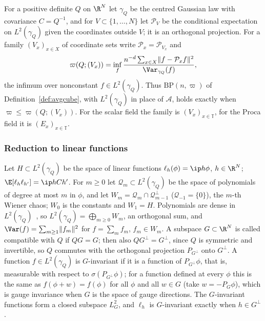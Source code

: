 For a positive definite $Q$ on $\R^N$ let $\gamma_Q$ be the centred Gaussian
law with covariance $C=Q^{-1}$, and for $V\subset\{1,\dots,N\}$ let
$\mathcal P_V$ be the conditional expectation on $L^2(\gamma_Q)$ given the
coordinates outside $V$; it is an orthogonal projection. For a family
$(V_x)_{x\in X}$ of coordinate sets write $\mathcal P_x=\mathcal P_{V_x}$
and
\begin{equation}\label{eq:ffvarpi}
\varpi(Q;(V_x))=\inf_f\frac{n^{-d}\sum_{x\in X}\lVert f-\mathcal P_xf
\rVert^2}{\Var_{\gamma_Q}(f)},
\end{equation}
the infimum over nonconstant $f\in L^2(\gamma_Q)$. Thus $\mathrm{BP}(n,
\varpi)$ of Definition~\ref{def:avgcube}, with $L^2(\gamma_Q)$ in place of
$\mathcal A$, holds exactly when $\varpi\le\varpi(Q;(V_x))$. For the scalar
field the family is $(V_x)_{x\in\mathbb T}$, for the Proca field it is
$(E_x)_{x\in\mathbb T}$.

\subsubsection{Reduction to linear functions}

Let $H\subset L^2(\gamma_Q)$ be the space of linear functions $\ell_h(\phi)
=\ip h\phi$, $h\in\R^N$; $\E[\ell_h\ell_{h'}]=\ip h{Ch'}$. For $m\ge0$ let
$\mathcal Q_m\subset L^2(\gamma_Q)$ be the space of polynomials of degree at
most $m$ in $\phi$, and let $W_m=\mathcal Q_m\cap\mathcal Q_{m-1}^\perp$
($\mathcal Q_{-1}=\{0\}$), the $m$-th Wiener chaos; $W_0$ is the constants
and $W_1=H$. Polynomials are dense in $L^2(\gamma_Q)$~\cite[Chapter~2]{Jan97},
so $L^2(\gamma_Q)=\bigoplus_{m\ge0}W_m$, an orthogonal sum, and $\Var(f)=
\sum_{m\ge1}\lVert f_m\rVert^2$ for $f=\sum_mf_m$, $f_m\in W_m$. A subspace
$G\subset\R^N$ is called compatible with $Q$ if $QG=G$; then also
$QG^\perp=G^\perp$, since $Q$ is symmetric and invertible, so $Q$ commutes
with the orthogonal projection $P_{G^\perp}$ onto $G^\perp$. A function $f\in
L^2(\gamma_Q)$ is $G$-invariant if it is a function of $P_{G^\perp}\phi$,
that is, measurable with respect to $\sigma(P_{G^\perp}\phi)$; for a function
defined at every $\phi$ this is the same as $f(\phi+w)=f(\phi)$ for all
$\phi$ and all $w\in G$ (take $w=-P_G\phi$), which is gauge invariance when
$G$ is the space of gauge directions. The $G$-invariant functions form a
closed subspace $L^2_G$, and $\ell_h$ is $G$-invariant exactly when $h\in
G^\perp$.

